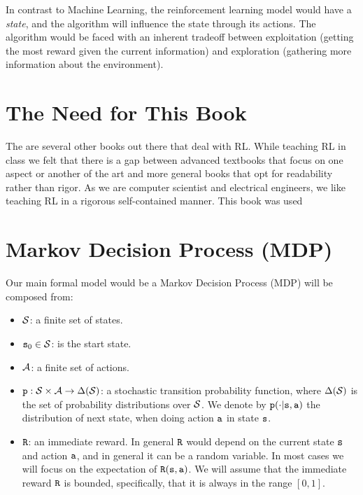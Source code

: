 In contrast to Machine Learning, the reinforcement learning model
would have a {\em state}, and the algorithm will influence the state
through its actions.
The algorithm would be faced with an inherent tradeoff between
exploitation (getting the most reward given the current information)
and exploration (gathering more information about the environment).

\section{The Need for This Book}

The are several other books out there that deal with RL. While teaching RL in class we felt that there is a gap between advanced textbooks that focus on one aspect or another of the art and more general books that opt for readability rather than rigor. As we are computer scientist and electrical engineers, we like teaching RL in a rigorous self-contained manner. This book was used 

\section{Markov Decision Process (MDP)}

Our main formal model would be a Markov Decision Process (MDP) will
be composed from:
\begin{itemize}
\item
$\mathcal{S}$: a finite set of states.
\item
${\tt s}_0\in \mathcal{S}$: is the start state.
\item
$\mathcal{A}$: a finite set of actions.
\item
${\tt p}:\mathcal{S}\times \mathcal{A}\rightarrow \Delta(\mathcal{S})
$: a stochastic transition probability function, where
$\Delta(\mathcal{S})$ is the set of probability distributions over
$\mathcal{S}$. We denote by ${\tt p}(\cdot|{\tt s},{\tt a})$ the
distribution of next state, when doing action ${\tt a}$ in state
${\tt s}$.
\item
${\tt R}$: an immediate reward. In general ${\tt R}$ would depend
on the current state ${\tt s}$ and action ${\tt a}$, and in general
it can be a random variable. In most cases we will focus on the
expectation of ${\tt R}({\tt s},{\tt a})$. We will assume that the
immediate reward ${\tt R}$ is bounded, specifically, that it is
always in the range $[0,1]$.
\end{itemize}

